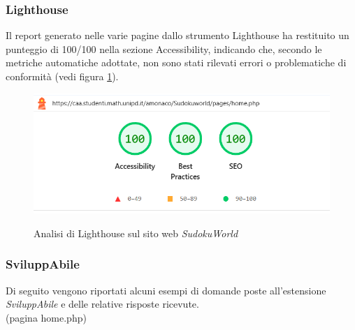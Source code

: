 \subsubsection{Lighthouse}
\noindent Il report generato nelle varie pagine dallo strumento Lighthouse ha restituito un punteggio di 100/100 nella sezione Accessibility, indicando che, secondo le metriche automatiche adottate, non sono stati rilevati errori o problematiche di conformità (vedi figura \ref{fig:Lighthouse_sudoku}).
\begin{figure}[H]
    \centering
    \includegraphics[width=0.6\linewidth, alt={Screenshot dell'analisi di Lighthouse sul sito web SudokuWorld}]{img/Lighthouse_sudoku.png}
    \caption{Analisi di Lighthouse sul sito web \textit{SudokuWorld}}\label{fig:Lighthouse_sudoku}
\end{figure}

\subsubsection{SviluppAbile}
\noindent Di seguito vengono riportati alcuni esempi di domande poste all’estensione \textit{SviluppAbile} e delle relative risposte ricevute. \newline
\\ \vspace{-0.5cm}
\noindent(pagina home.php)\\
